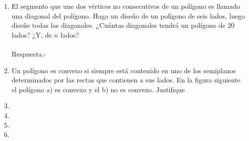 \documentclass[10pt]{article}
\begin{document}
\begin{enumerate}
	\item El segmento que une dos vértices no consecutivos de un polígono es llamado una diagonal del polígono. Haga un diseño de un polígono de seis lados, luego diseñe todas las diagonales. ¿Cuántas diagonales tendrá un polígono de $20$ lados? ¿Y, de $n$ lados?\\\\
	Respuesta.-\;

    \item Un polígono es convexo si siempre está contenido en uno de los semiplanos determinados por las rectas que contienen a sus lados. En la figura siguiente el polígono a) es convexo y el b) no es convexo. Justifique

	\item 

	\item 

	\item 

	\item 

    \end{enumerate}
\end{document}
